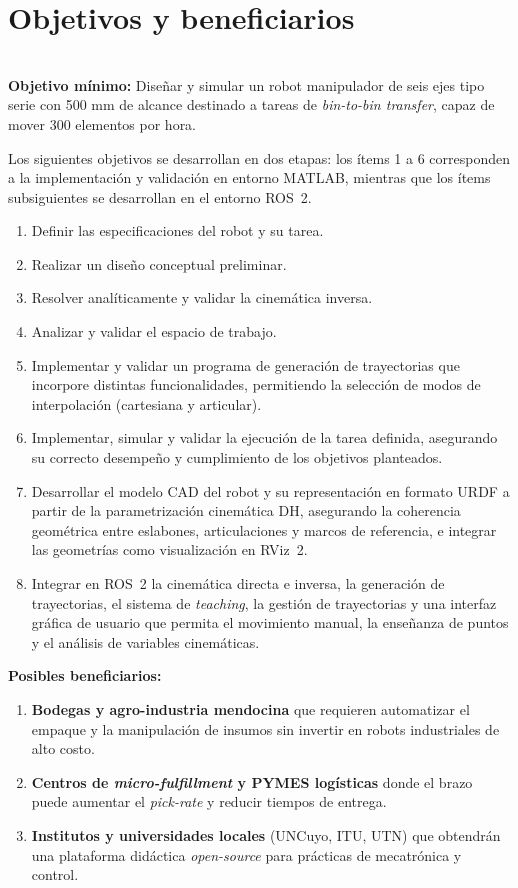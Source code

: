 \documentclass{article}
\begin{document}
\newpage
\section{Objetivos y beneficiarios}
\label{sec:objetivos}

\,\\
\textbf{Objetivo mínimo:} Diseñar y simular un robot manipulador de seis ejes tipo serie con 500 mm de alcance destinado a tareas de \textit{bin-to-bin transfer}, capaz de mover 300 elementos por hora.

Los siguientes objetivos se desarrollan en dos etapas: los ítems 1 a 6 corresponden a la implementación y validación en entorno MATLAB, mientras que los ítems subsiguientes se desarrollan en el entorno ROS~2.

\begin{enumerate}

    \item Definir las especificaciones del robot y su tarea.
    \item Realizar un diseño conceptual preliminar.
    \item Resolver analíticamente y validar la cinemática inversa.
    \item Analizar y validar el espacio de trabajo.
    \item Implementar y validar un programa de generación de trayectorias que incorpore distintas funcionalidades, permitiendo la selección de modos de interpolación (cartesiana y articular).
    \item Implementar, simular y validar la ejecución de la tarea definida, asegurando su correcto desempeño y cumplimiento de los objetivos planteados.
    \item Desarrollar el modelo CAD del robot y su representación en formato URDF a partir de la parametrización cinemática DH, asegurando la coherencia geométrica entre eslabones, articulaciones y marcos de referencia, e integrar las geometrías como visualización en RViz~2.
    \item Integrar en ROS~2 la cinemática directa e inversa, la generación de trayectorias, el sistema de \textit{teaching}, la gestión de trayectorias y una interfaz gráfica de usuario que permita el movimiento manual, la enseñanza de puntos y el análisis de variables cinemáticas.
\end{enumerate}


\medskip
\textbf{Posibles beneficiarios: }
\begin{enumerate}
    \item \textbf{Bodegas y agro-industria mendocina} que requieren automatizar el empaque y la manipulación de insumos sin invertir en robots industriales de alto costo.
    \item \textbf{Centros de \textit{micro-fulfillment} y PYMES logísticas} donde el brazo puede aumentar el \textit{pick-rate} y reducir tiempos de entrega.
    \item \textbf{Institutos y universidades locales} (UNCuyo, ITU, UTN) que obtendrán una plataforma didáctica \textit{open-source} para prácticas de mecatrónica y control.   
\end{enumerate}
\end{document}
